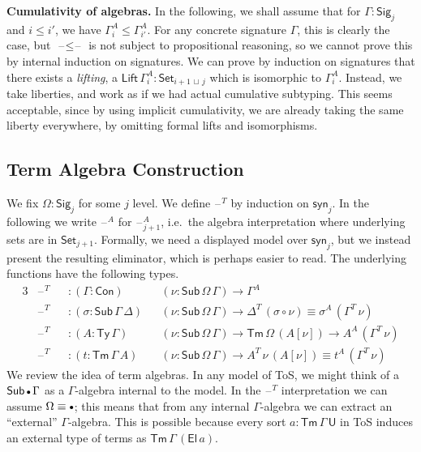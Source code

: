 \documentclass[12pt,a4paper,twoside,openany]{book}
\theoremstyle{remark}
\theoremstyle{definition}
\theoremstyle{theorem}
\newcommand{\ms}[1]{\mathsf{#1}}
\newcommand{\Con}{\mathsf{Con}}
\newcommand{\Sub}{\mathsf{Sub}}
\newcommand{\Tm}{\mathsf{Tm}}
\newcommand{\Ty}{\mathsf{Ty}}
\newcommand{\U}{\mathsf{U}}
\newcommand{\El}{\mathsf{El}}
\newcommand{\blank}{\mathord{\hspace{1pt}\text{--}\hspace{1pt}}}
\newcommand{\Set}{\mathsf{Set}}
\newcommand{\emptycon}{\scaleobj{.75}\bullet}
\newcommand{\Sig}{\mathsf{Sig}}
\newcommand{\syn}{\mathsf{syn}}
\newcommand{\lub}{\,\sqcup\,}
\begin{document}
\noindent\textbf{Cumulativity of algebras.} In the following, we shall assume
that for $\Gamma : \Sig_j$ and $i \leq i'$, we have $\Gamma^A_i \leq
\Gamma^A_{i'}$. For any concrete signature $\Gamma$, this is clearly the case,
but $\blank\!\leq\!\blank$ is not subject to propositional reasoning, so we
cannot prove this by internal induction on signatures. We can prove by induction
on signatures that there exists a \emph{lifting}, a $\ms{Lift}\,\Gamma^A_i :
\Set_{i+1 \lub j}$ which is isomorphic to $\Gamma^A_{i}$. Instead, we take
liberties, and work as if we had actual cumulative subtyping. This seems
acceptable, since by using implicit cumulativity, we are already taking the same
liberty everywhere, by omitting formal lifts and isomorphisms.

\subsection{Term Algebra Construction}
\label{sec:fqii-term-algebra-construction}
We fix $\Omega : \Sig_j$ for some $j$ level. We define $\blank^T$ by induction
on $\syn_j$. In the following we write $\blank^A$ for $\blank^A_{j+1}$,
i.e.\ the algebra interpretation where underlying sets are in
$\Set_{j+1}$. Formally, we need a displayed model over $\syn_j$, but we instead
present the resulting eliminator, which is perhaps easier to read. The
underlying functions have the following types.
\begin{alignat*}{3}
  &\blank^T &&: (\Gamma : \Con)&&(\nu : \Sub\,\Omega\,\Gamma) \to \Gamma^A\\
  &\blank^T &&: (\sigma : \Sub\,\Gamma\,\Delta)&&(\nu : \Sub\,\Omega\,\Gamma) \to \Delta^T\,(\sigma \circ \nu) \equiv \sigma^A\,(\Gamma^T\,\nu)\\
  &\blank^T &&: (A : \Ty\,\Gamma)&&(\nu : \Sub\,\Omega\,\Gamma) \to \Tm\,\Omega\,(A[\nu])
  \to A^A\,(\Gamma^T\,\nu)\\
  &\blank^T &&: (t : \Tm\,\Gamma\,A)&&(\nu : \Sub\,\Omega\,\Gamma) \to A^T\,\nu\,(A[\nu]) \equiv t^A\,(\Gamma^T\,\nu)
\end{alignat*}
We review the idea of term algebras. In any model of ToS, we might think of a
$\Sub\,\emptycon\,\Gamma$ as a $\Gamma$-algebra internal to the model. In the
$\blank^T$ interpretation we can assume $\Omega \equiv \emptycon$; this means
that from any internal $\Gamma$-algebra we can extract an ``external''
$\Gamma$-algebra. This is possible because every sort $a : \Tm\,\Gamma\,\U$ in
ToS induces an external type of terms as $\Tm\,\Gamma\,(\El\,a)$.
\end{document}
